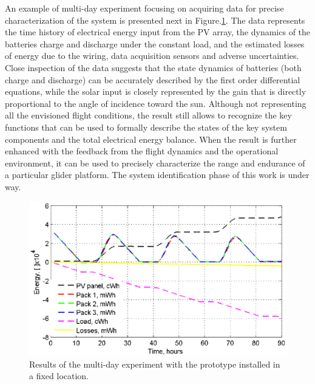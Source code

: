 \documentclass{ifacconf}
\begin{document}
An example of multi-day experiment focusing on acquiring data for precise
characterization of the system is presented next in
Figure.\ref{fig:MultiDay_enrg}. The data represents the time history of
electrical energy input from the PV array, the dynamics of the batteries
charge and discharge under the constant load, and the estimated losses of
energy due to the wiring, data acquisition sensors and adverse uncertainties.
Close inspection of the data suggests that the state dynamics of batteries
(both charge and discharge) can be accurately described by the first order
differential equations, while the solar input is closely represented by the
gain that is directly proportional to the angle of incidence toward the sun.
Although not representing all the envisioned flight conditions, the result
still allows to recognize the key functions that can be used to formally
describe the states of the key system components and the total electrical
energy balance. When the result is further enhanced with the feedback from
the flight dynamics and the operational environment, it can be used to
precisely characterize the range and endurance of a particular glider
platform. The system identification phase of this work is under way.
\begin{figure}[thpb]
  \centering
  \includegraphics[scale=0.61]{Figures/MultiDay_energy.eps}
  \caption{Results of the multi-day experiment with the prototype
  installed in a fixed location.}
  \label{fig:MultiDay_enrg}
\end{figure}
\end{document}
